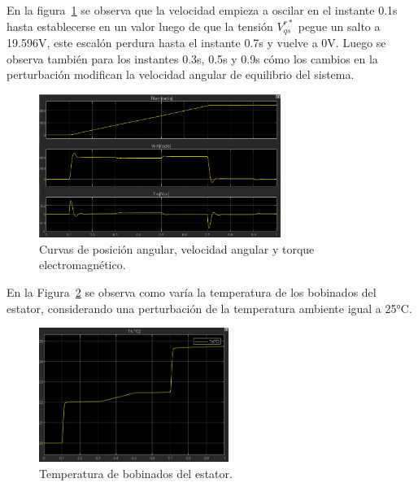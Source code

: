 \documentclass{article}
\begin{document}
En la figura~\ref{fig:VelPosTorqueAlineados} se observa que la velocidad empieza a oscilar en el instante 0.1s hasta establecerse en un valor luego de que la tensión \(V^{r*}_{qs}\) pegue un salto a 19.596V, este escalón perdura hasta el instante 0.7s y vuelve a 0V. Luego se observa también para los instantes 0.3s, 0.5s y 0.9s cómo los cambios en la perturbación modifican la velocidad angular de equilibrio del sistema.

\begin{figure}[H]
    \centering
    \includegraphics[width=0.7\textwidth]{Imagenes/VelPosTorqueAlineados.png}
    \caption{Curvas de posición angular, velocidad angular y torque electromagnético.}
    \label{fig:VelPosTorqueAlineados}
\end{figure}



En la Figura~\ref{fig:TemperaturaEstatorDT} se observa como varía la temperatura de los bobinados del estator, considerando una perturbación de la temperatura ambiente igual a 25°C.
\begin{figure}[H]
    \centering
    \includegraphics[width=0.55\textwidth]{Imagenes/TemperaturaEstatorDT.png}
    \caption{Temperatura de bobinados del estator.}
    \label{fig:TemperaturaEstatorDT}
\end{figure}
\end{document}
